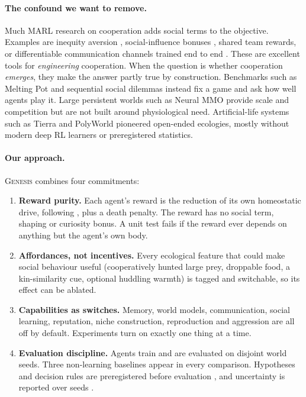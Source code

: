 \documentclass[10pt]{article}
\newcommand{\genesis}{\textsc{Genesis}}
\begin{document}
\paragraph{The confound we want to remove.}
Much MARL research on cooperation adds social terms to the objective. Examples are inequity aversion
\citep{hughes2018inequity}, social-influence bonuses \citep{jaques2019influence}, shared team rewards, or
differentiable communication channels trained end to end \citep{foerster2016communicate}. These are excellent tools
for \emph{engineering} cooperation. When the question is whether cooperation \emph{emerges}, they make the answer
partly true by construction. Benchmarks such as Melting Pot \citep{leibo2021meltingpot} and sequential social
dilemmas \citep{leibo2017ssd} instead fix a game and ask how well agents play it. Large persistent worlds such as
Neural MMO \citep{suarez2019neuralmmo} provide scale and competition but are not built around physiological need.
Artificial-life systems such as Tierra and PolyWorld \citep{ray1991tierra,yaeger1994polyworld} pioneered open-ended
ecologies, mostly without modern deep RL learners or preregistered statistics.

\paragraph{Our approach.}
\genesis{} combines four commitments:
\begin{enumerate}
\item \textbf{Reward purity.} Each agent's reward is the reduction of its own homeostatic drive, following
\citet{keramati2014homeostatic}, plus a death penalty. The reward has no social term, shaping or curiosity bonus.
A unit test fails if the reward ever depends on anything but the agent's own body.
\item \textbf{Affordances, not incentives.} Every ecological feature that could make social behaviour useful
(cooperatively hunted large prey, droppable food, a kin-similarity cue, optional huddling warmth) is tagged and
switchable, so its effect can be ablated.
\item \textbf{Capabilities as switches.} Memory, world models, communication, social learning, reputation, niche
construction, reproduction and aggression are all off by default. Experiments turn on exactly one thing at a time.
\item \textbf{Evaluation discipline.} Agents train and are evaluated on disjoint world seeds. Three non-learning
baselines appear in every comparison. Hypotheses and decision rules are preregistered before evaluation
\citep{nosek2018preregistration}, and uncertainty is reported over seeds
\citep{henderson2018matters,agarwal2021precipice}.
\end{enumerate}
\end{document}
